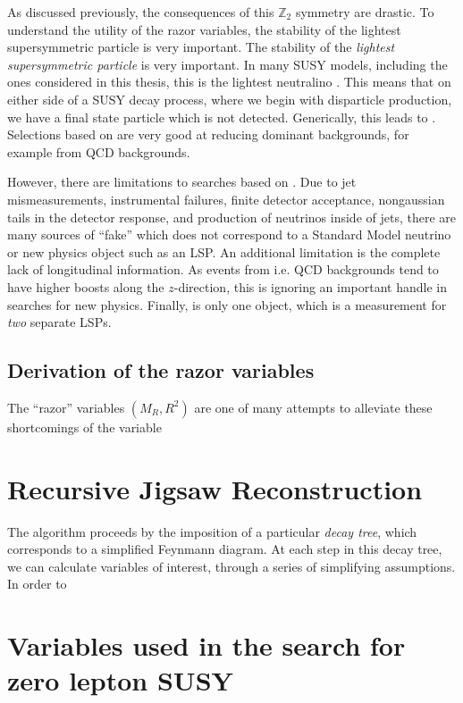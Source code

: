 As discussed previously, the consequences of this $\mathbb{Z}_2$ symmetry are drastic.
To understand the utility of the razor variables, the stability of the lightest supersymmetric particle is very important.
The stability of the \textit{lightest supersymmetric particle} is very important.
In many SUSY models, including the ones considered in this thesis, this is the lightest neutralino \lsp.
This means that on either side of a SUSY decay process, where we begin with disparticle production, we have a final state particle which is not detected.
Generically, this leads to \met.
Selections based on \met are very good at reducing dominant backgrounds, for example from QCD backgrounds.

However, there are limitations to searches based on \met.
Due to jet mismeasurements, instrumental failures, finite detector acceptance, nongaussian tails in the detector response, and production of neutrinos inside of jets, there are many sources of ``fake'' \met which does not correspond to a Standard Model neutrino or new physics object such as an LSP.
An additional limitation is the complete lack of longitudinal information.
As events from i.e. QCD backgrounds tend to have higher boosts along the $z$-direction, this is ignoring an important handle in searches for new physics.
Finally, \met is only one object, which is a measurement for \textit{two} separate LSPs.


\subsection{Derivation of the razor variables}

The ``razor'' variables $(M_R, R^2)$ are one of many attempts to alleviate these shortcomings of the \met variable\footnotemark
{}


\section{Recursive Jigsaw Reconstruction}


The algorithm proceeds by the imposition of a particular \textit{decay tree}, which corresponds to a simplified Feynmann diagram.
At each step in this decay tree, we can calculate variables of interest, through a series of simplifying assumptions.
In order to

\section{Variables used in the search for zero lepton SUSY}